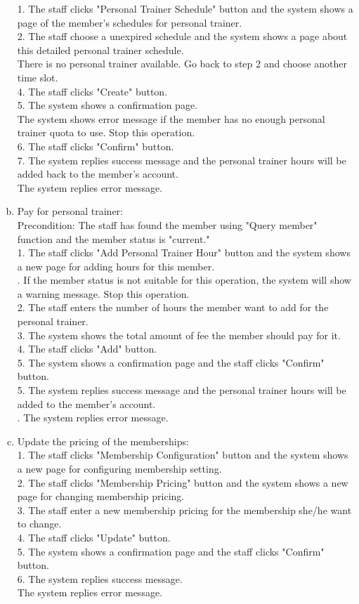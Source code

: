 \documentclass[11pt]{article}
\begin{document}
\begin{enumerate}[(a)]
1. The staff clicks "Personal Trainer Schedule" button and the system shows a page of the member's schedules for personal trainer.\\
2. The staff choose a unexpired schedule and the system shows a page about this detailed personal trainer schedule.\\
 There is no personal trainer available. Go back to step 2 and choose another time slot.\\
4. The staff clicks "Create" button.\\
5. The system shows a confirmation page.\\
 The system shows error message if the member has no enough personal trainer quota to use. Stop this operation.\\
6. The staff clicks "Confirm" button.\\
7. The system replies success message and the personal trainer hours will be added back to the member's account.\\
 The system replies error message.
\item Pay for personal trainer:\\
Precondition: The staff has found the member using "Query member" function and the member status is "current."\\
1. The staff clicks "Add Personal Trainer Hour" button and the system shows a new page for adding hours for this member.\\
. If the member status is not suitable for this operation, the system will show a warning message. Stop this operation.\\ 
2. The staff enters the number of hours the member want to add for the personal trainer.\\
3. The system shows the total amount of fee the member should pay for it.\\
4. The staff clicks "Add" button.\\
5. The system shows a confirmation page and the staff clicks "Confirm" button.\\
5. The system replies success message and the personal trainer hours will be added to the member's account.\\
. The system replies error message.
\item Update the pricing of the memberships:\\
1. The staff clicks "Membership Configuration" button and the system shows a new page for configuring membership setting.\\
2. The staff clicks "Membership Pricing" button and the system shows a new page for changing membership pricing.\\
3. The staff enter a new membership pricing for the membership she/he want to change.\\
4. The staff clicks "Update" button.\\
5. The system shows a confirmation page and the staff clicks "Confirm" button.\\
6. The system replies success message.\\
 The system replies error message.
\end{enumerate}
\end{document}
